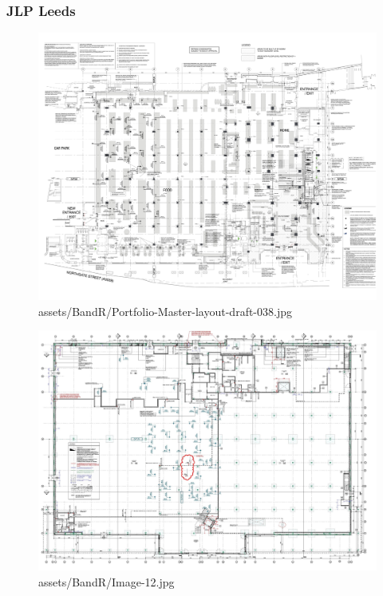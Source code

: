 \documentclass[
]{article}
\begin{document}
\subsubsection{JLP Leeds}\label{jlp-leeds}

\begin{figure}[H]

{\centering \includegraphics{assets/BandR/Portfolio-Master-layout-draft-038.jpg}

}

\caption{assets/BandR/Portfolio-Master-layout-draft-038.jpg}

\end{figure}%
\begin{figure}[H]

{\centering \includegraphics{assets/BandR/Image-12.jpg}

}

\caption{assets/BandR/Image-12.jpg}

\end{figure}%
\end{document}
